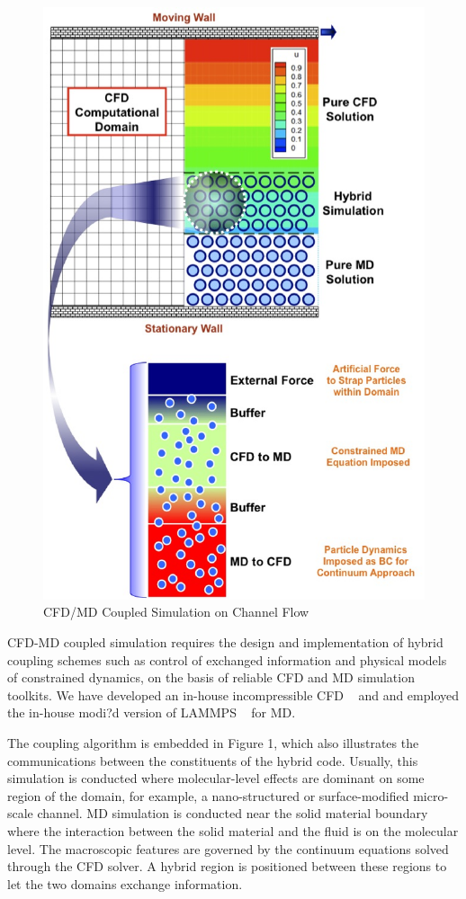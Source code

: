 \documentclass[times, 10pt,twocolumn]{article}
\begin{document}
\begin{figure}
\centering
\includegraphics[scale=0.45]{fig1.eps}
\caption{CFD/MD Coupled Simulation on Channel Flow}
\end{figure}

CFD-MD coupled simulation requires the design and implementation of hybrid coupling schemes such as control of exchanged information and physical models of constrained dynamics, on the basis of reliable CFD and MD simulation toolkits. We have developed an in-house incompressible CFD ~\cite{Lee:2006} and and employed the in-house modi?d version of LAMMPS ~\cite{LAMMPS} for MD. 

The coupling algorithm is embedded in Figure 1, which also illustrates the communications between the constituents of the hybrid code. Usually, this simulation is conducted where molecular-level effects are dominant on some region of the domain, for example, a nano-structured or surface-modified micro-scale channel. MD simulation is conducted near the solid material boundary where the interaction between the solid material and the fluid is on the molecular level. The macroscopic features are governed by the continuum equations solved through the CFD solver. A hybrid region is positioned between these regions to let the two domains exchange information.
\end{document}
